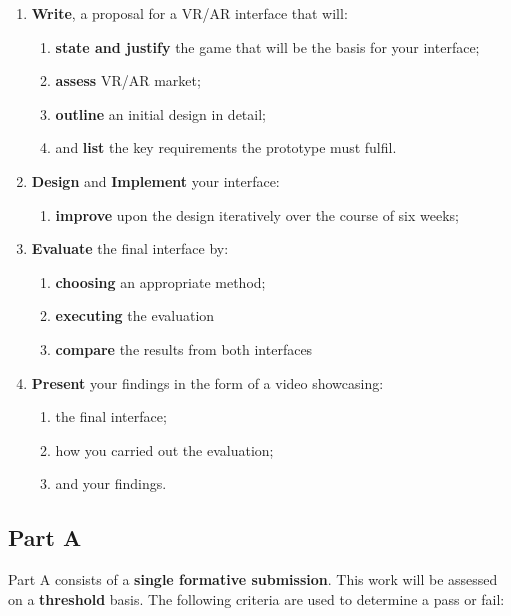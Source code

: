 \documentclass{../../fal_assignment}
\begin{document}
\begin{enumerate}[label=(\Alph*)]
    \item \textbf{Write}, a proposal for a VR/AR interface that will:
    	\begin{enumerate}[label=\roman*.]
    		\item \textbf{state and justify} the game that will be the basis for your interface;
		\item \textbf{assess} VR/AR market;
		\item \textbf{outline} an initial design in detail;
		\item and \textbf{list} the key requirements the prototype must fulfil.
	\end{enumerate}
    \item \textbf{Design} and \textbf{Implement} your interface:
    	\begin{enumerate}[label=\roman*.]
		\item \textbf{improve} upon the design iteratively over the course of six weeks;
	\end{enumerate}
    \item \textbf{Evaluate} the final interface by:
    	\begin{enumerate}[label=\roman*.]
		\item \textbf{choosing} an appropriate method;
		\item \textbf{executing} the evaluation
		\item \textbf{compare} the results from both interfaces
	\end{enumerate}
    \item \textbf{Present} your findings in the form of a video showcasing: 
    	    	\begin{enumerate}[label=\roman*.]
    		\item the final interface;
    		\item how you carried out the evaluation;
		\item and your findings.
	\end{enumerate}
\end{enumerate}


\subsection*{Part A}

Part A consists of a \textbf{single formative submission}. This work will be assessed on a \textbf{threshold} basis. The following criteria are used to determine a pass or fail:
\end{document}
